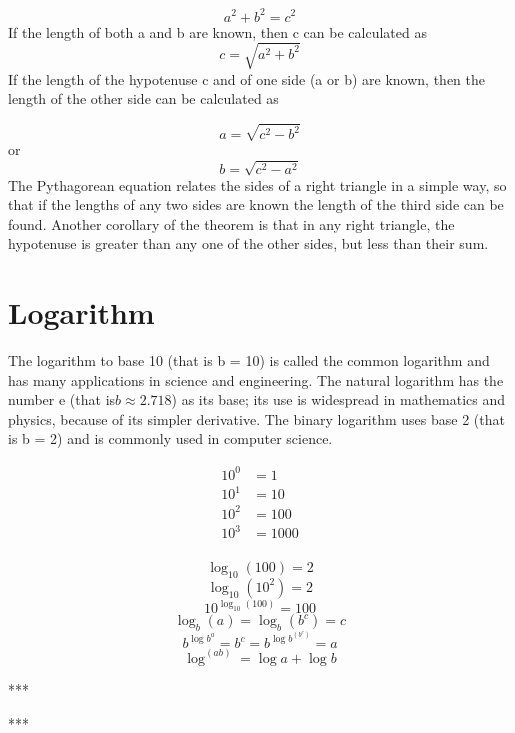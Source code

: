 \begin{equation}
	a^2 + b^2 = c^2
\end{equation}
	If the length of both a and b are known, then c can be calculated as	
\begin{equation}
	c = \sqrt{a^2+b^2}
\end{equation}
	If the length of the hypotenuse c and of one side (a or b) are known, then the length of the other side can be calculated as

\begin{equation}
	a = \sqrt{c^2-b^2}
\end{equation}
	or
\begin{equation}
	b = \sqrt{c^2-a^2}
\end{equation}
	The Pythagorean equation relates the sides of a right triangle in a simple way, so that if the 	lengths of any two sides are known the length of the third side can be found. Another corollary of the theorem is that in any right triangle, the hypotenuse is greater than any one of the other sides, but less than their sum.

\section{Logarithm}
		The logarithm to base 10 (that is b = 10) is called the common logarithm and has many applications in science and engineering. The natural logarithm has the number e (that is$b  \approx 2.718$) as its base; its use is widespread in mathematics and physics, because of its simpler derivative. The binary logarithm uses base 2 (that is b = 2) and is commonly used in computer science.
	
	
	\begin{align*}
		10^0 &= 1 \\
		10^1 &= 10 \\
		10^2 &= 100 \\
		10^3 &= 1000 \\
	\end{align*}
	
	
	\begin{equation}
		\log_{10}(100) = 2
	\end{equation}
	\begin{equation}
		\log_{10}(10^2) = 2
	\end{equation}
	\begin{equation}
		10^{\log_{10}(100)} = 100
	\end{equation}
	\begin{equation}
		\log_{b} (a) = \log_{b} (b^c)= c
	\end{equation}
	\begin{equation}
		b^{\log b^a} = b^c = b^{\log b^{(b^c)}} = a
	\end{equation}
	\begin{equation}
		\log^{(ab)} = \log a +\log b
	\end{equation}
	

	***
	
	***
	

